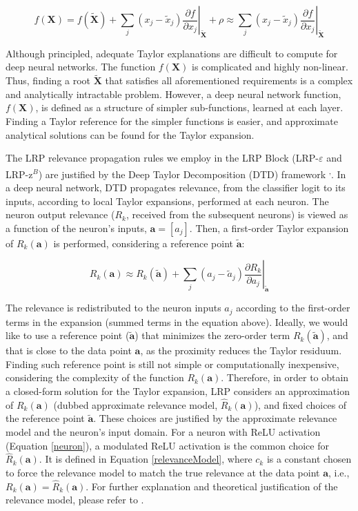 \documentclass[fleqn,10pt]{wlscirep}
\newcommand\at[2]{\left.#1\right|_{#2}}
\begin{document}
{\begin{equation}
\label{taylorRelevance}
    f(\bm{X}) = f(\bm{\tilde{X}}) + \sum_{j}(x_{j}-\tilde{x}_{j})\at{\frac{\partial f}{\partial x_{j}}}{\bm{\tilde{X}}} + \rho \approx \sum_{j}(x_{j}-\tilde{x}_{j})\at{\frac{\partial f}{\partial x_{j}}}{\bm{\tilde{X}}}
\end{equation}

Although principled, adequate Taylor explanations are difficult to compute for deep neural networks. The function $f(\bm{X})$ is complicated and highly non-linear. Thus, finding a root $\bm{\tilde{X}}$ that satisfies all aforementioned requirements is a complex and analytically intractable problem\cite{LRPZb}. However, a deep neural network function, $f(\bm{X})$, is defined as a structure of simpler sub-functions, learned at each layer. Finding a Taylor reference for the simpler functions is easier, and approximate analytical solutions can be found for the Taylor expansion\cite{LRPZb}.

The LRP relevance propagation rules we employ in the LRP Block (LRP-$\varepsilon$ and LRP-z$^{B}$) are justified by the Deep Taylor Decomposition (DTD) framework \cite{LRPZb}\textsuperscript{,}\cite{LRPBook}. In a deep neural network, DTD propagates relevance, from the classifier logit to its inputs, according to local Taylor expansions, performed at each neuron. The neuron output relevance ($R_{k}$, received from the subsequent neurons) is viewed as a function of the neuron's inputs, $\bm{a}=[a_{j}]$. Then, a first-order Taylor expansion of $R_{k}(\bm{a})$ is performed, considering a reference point $\bm{\tilde{a}}$:

\begin{equation}
    R_{k}(\bm{a}) \approx R_{k}(\bm{\tilde{a}}) + \sum_{j}(a_{j}-\tilde{a}_{j})\at{\frac{\partial R_{k}}{\partial a_{j}}}{\bm{\tilde{a}}}
\end{equation}

The relevance is redistributed to the neuron inputs $a_{j}$ according to the first-order terms in the expansion (summed terms in the equation above)\cite{LRPBook}. Ideally, we would like to use a reference point ($\bm{\tilde{a}}$) that minimizes the zero-order term $R_{k}(\bm{\tilde{a}})$, and that is close to the data point $\bm{a}$, as the proximity reduces the Taylor residuum. Finding such reference point is still not simple or computationally inexpensive, considering the complexity of the function $R_{k}(\bm{a})$\cite{LRP}. Therefore, in order to obtain a closed-form solution for the Taylor expansion, LRP considers an approximation of $R_{k}(\bm{a})$ (dubbed approximate relevance model, $\hat{R}_{k}(\bm{a})$), and fixed choices of the reference point $\bm{\tilde{a}}$. These choices are justified by the approximate relevance model and the neuron's input domain\cite{LRPBook}. For a neuron with ReLU activation (Equation \ref{neuron}), a modulated ReLU activation is the common choice for $\hat{R}_{k}(\bm{a})$. It is defined in Equation \ref{relevanceModel}, where $c_{k}$ is a constant chosen to force the relevance model to match the true relevance at the data point $\bm{a}$, i.e., $R_{k}(\bm{a})=\hat{R}_{k}(\bm{a})$. For further explanation and theoretical justification of the relevance model, please refer to \cite{LRPBook}.

}
\end{document}
